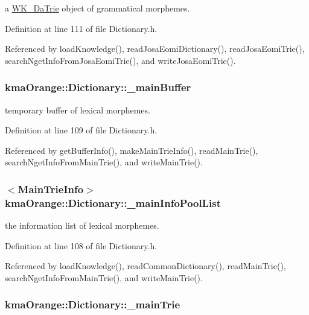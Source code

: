 a \hyperlink{classkmaOrange_1_1WK__DaTrie}{WK\_\-DaTrie} object of grammatical morphemes. 



Definition at line 111 of file Dictionary.h.

Referenced by loadKnowledge(), readJosaEomiDictionary(), readJosaEomiTrie(), searchNgetInfoFromJosaEomiTrie(), and writeJosaEomiTrie().\hypertarget{classkmaOrange_1_1Dictionary_6d1c4742b3526ce18ef708b16afb9686}{
\subsubsection[{\_\-mainBuffer}]{ {\bf kmaOrange::Dictionary::\_\-mainBuffer}}}
\label{classkmaOrange_1_1Dictionary_6d1c4742b3526ce18ef708b16afb9686}


temporary buffer of lexical morphemes. 



Definition at line 109 of file Dictionary.h.

Referenced by getBufferInfo(), makeMainTrieInfo(), readMainTrie(), searchNgetInfoFromMainTrie(), and writeMainTrie().\hypertarget{classkmaOrange_1_1Dictionary_8b4809c5e4427e0a886ebb98ccb1458e}{
\subsubsection[{\_\-mainInfoPoolList}]{$<${\bf MainTrieInfo}$>$ {\bf kmaOrange::Dictionary::\_\-mainInfoPoolList}}}
\label{classkmaOrange_1_1Dictionary_8b4809c5e4427e0a886ebb98ccb1458e}


the information list of lexical morphemes. 



Definition at line 108 of file Dictionary.h.

Referenced by loadKnowledge(), readCommonDictionary(), readMainTrie(), searchNgetInfoFromMainTrie(), and writeMainTrie().\hypertarget{classkmaOrange_1_1Dictionary_52eb564f4339216c94d197ca3cadb7e7}{
\subsubsection[{\_\-mainTrie}]{ {\bf kmaOrange::Dictionary::\_\-mainTrie}}}
\label{classkmaOrange_1_1Dictionary_52eb564f4339216c94d197ca3cadb7e7}


